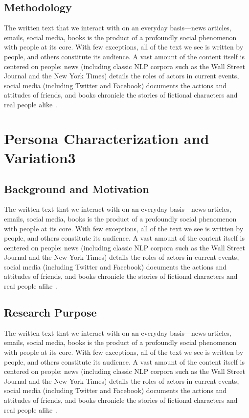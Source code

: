 \documentclass[11pt]{article}
\renewcommand\cite{\citep}  %
\begin{document}
\subsection{Methodology}
The written text that we interact with on an everyday basis—news articles, emails, social media, books is the product of a profoundly social phenomenon with people at its core. With few exceptions, all of the text we see is written by people, and others constitute its audience. A vast amount of the content itself is centered on people: news (including classic NLP corpora such as the Wall Street Journal and the New York Times) details the roles of actors in current events, social media (including Twitter and Facebook) documents
the actions and attitudes of friends, and books chronicle the stories of fictional characters and real people alike~\cite{serban2016building}.
\section{Persona Characterization and Variation3}
\subsection{Background and Motivation}
The written text that we interact with on an everyday basis—news articles, emails, social media, books is the product of a profoundly social phenomenon with people at its core. With few exceptions, all of the text we see is written by people, and others constitute its audience. A vast amount of the content itself is centered on people: news (including classic NLP corpora such as the Wall Street Journal and the New York Times) details the roles of actors in current events, social media (including Twitter and Facebook) documents
the actions and attitudes of friends, and books chronicle the stories of fictional characters and real people alike~\cite{serban2016building}.
\subsection{Research Purpose}
The written text that we interact with on an everyday basis—news articles, emails, social media, books is the product of a profoundly social phenomenon with people at its core. With few exceptions, all of the text we see is written by people, and others constitute its audience. A vast amount of the content itself is centered on people: news (including classic NLP corpora such as the Wall Street Journal and the New York Times) details the roles of actors in current events, social media (including Twitter and Facebook) documents
the actions and attitudes of friends, and books chronicle the stories of fictional characters and real people alike~\cite{serban2016building}.
\end{document}
